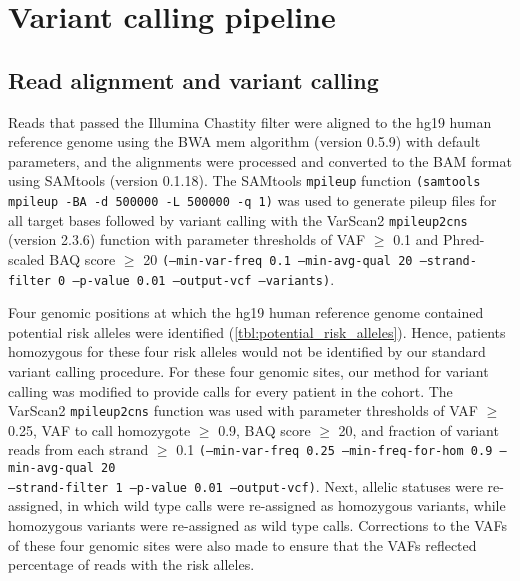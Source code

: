 \section{Variant calling pipeline}
\label{sec:Variantcallingpipeline}

\subsection{Read alignment and variant calling}

Reads that passed the Illumina Chastity filter were aligned to the hg19 human reference genome using the \acs{BWA} mem algorithm (version 0.5.9) with default parameters, and the alignments were processed and converted to the BAM format using SAMtools (version 0.1.18). The SAMtools \texttt{mpileup} function \texttt{(samtools mpileup -BA -d 500000 -L 500000 -q 1)} was used to generate pileup files for all target bases followed by variant calling with the VarScan2 \texttt{mpileup2cns} (version 2.3.6) function with parameter thresholds of VAF $\geq$ 0.1 and Phred-scaled BAQ score $\geq$ 20 \texttt{(--min-var-freq 0.1 --min-avg-qual 20 --strand-filter 0 --p-value 0.01 --output-vcf --variants)}.

Four genomic positions at which the hg19 human reference genome contained potential risk alleles were identified (\autoref{tbl:potential_risk_alleles}). Hence, patients homozygous for these four risk alleles would not be identified by our standard variant calling procedure. For these four genomic sites, our method for variant calling was modified to provide calls for every patient in the cohort. The VarScan2 \texttt{mpileup2cns} function was used with parameter thresholds of VAF $\geq$ 0.25, VAF to call homozygote $\geq$ 0.9, BAQ score $\geq$ 20, and fraction of variant reads from each strand $\geq$ 0.1 \texttt{(--min-var-freq 0.25 --min-freq-for-hom 0.9 --min-avg-qual 20 \\--strand-filter 1 --p-value 0.01 --output-vcf)}. Next, allelic statuses were re-assigned, in which wild type calls were re-assigned as homozygous variants, while homozygous variants were re-assigned as wild type calls. Corrections to the VAFs of these four genomic sites were also made to ensure that the VAFs reflected percentage of reads with the risk alleles.


